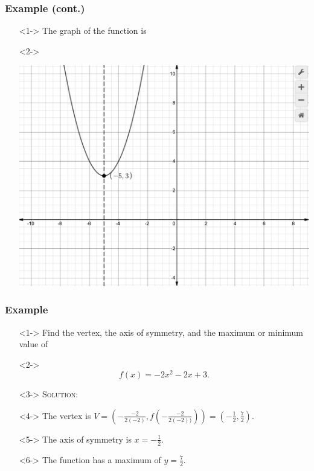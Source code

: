 \documentclass[handout]{beamer}
\begin{document}
\begin{frame}
	\frametitle{Example (cont.)} 
	\begin{enumerate}
		\item[]<1-> The graph of the function is 
		\item[]<2->\begin{center}
				\includegraphics[scale=0.25]{3_3_2.png} 		
			\end{center} 
	\end{enumerate}
\end{frame}

\begin{frame}
	\frametitle{Example} 
	\begin{enumerate}
		\item[]<1-> Find the vertex, the axis of symmetry, and the maximum or minimum value of 
		\item[]<2->\[ f(x)=-2x^{2}-2x+3. \] 
		\item[]<3-> \textsc{Solution:} 
		\item[]<4-> The vertex is $V=\left( -\frac{-2}{2(-2)}, f \left( -\frac{-2}{2(-2))} \right)\right)=\left( -\frac{1}{2}, \frac{7}{2}\right)$. 
		\item[]<5-> The axis of symmetry is $x=-\frac{1}{2}$. 
		\item[]<6-> The function has a maximum of $y=\frac{7}{2}$.  
	\end{enumerate}
\end{frame}
\end{document}
